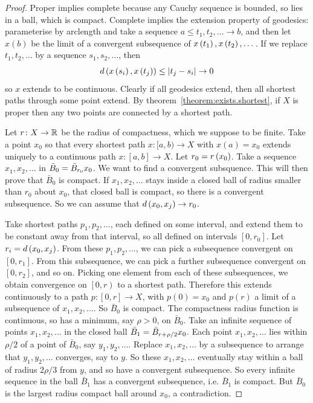 \begin{proof}
Proper implies complete because any Cauchy sequence is bounded, so lies in a ball, which is compact.
Complete implies the extension property of geodesics: parameterise by arclength and take a sequence \(a \le t_1, t_2, \dots \to b\), and then let \(x(b)\) be the limit of a convergent subsequence of \(x\left(t_1\right), x\left(t_2\right), \dots\).
If we replace \(t_1, t_2, \dots\) by a sequence \(s_1, s_2, \dots\), then 
\[
d\left(x\left(s_i\right),x\left(t_j\right)\right) \le \left|t_j-s_i\right| \to 0
\]
so \(x\) extends to be continuous.
Clearly if all geodesics extend, then all shortest paths through some point extend.
By theorem~\vref{theorem:exists.shortest}, if \(X\) is proper then any two points are connected by a shortest path.

Let \(r \colon X \to \mathbb{R}^{}\) be the radius of compactness, which we suppose to be finite.
Take a point \(x_0\) so that every shortest path \(x \colon [a,b) \to X\) with \(x(a)=x_0\) extends uniquely to a continuous path \(x \colon [a,b] \to X\).
Let \(r_0=r\left(x_0\right)\).
Take a sequence \(x_1, x_2, \dots\) in \(\bar{B}_0=\ballClosed{r_0}{x_0}\).
We want to find a convergent subsquence.
This will then prove that \(\bar{B}_0\) is compact.
If \(x_1, x_2, \dots\) stays inside a closed ball of radius smaller than \(r_0\) about \(x_0\), that closed ball is compact, so there is a convergent subsequence.
So we can assume that \(d\left(x_0,x_j\right) \to r_0\).

Take shortest paths \(p_1, p_2, \dots\), each defined on some interval, and extend them to be constant away from that interval, so all defined on intervals \(\left[0,r_0\right]\).
Let \(r_i=d\left(x_0,x_j\right)\).
From these \(p_1, p_2, \dots\), we can pick a subsequence convergent on \(\left[0,r_1\right]\).
From this subsequence, we can pick a further subsequence convergent on \(\left[0,r_2\right]\), and so on.
Picking one element from each of these subsequences, we obtain convergence on \(\left[0,r\right)\) to a shortest path.
Therefore this extends continuously to a path \(p \colon [0,r] \to X\), with \(p(0)=x_0\) and \(p(r)\) a limit of a subsequence of \(x_1, x_2, \dots\).
So \(\bar{B}_0\) is compact.
The compactness radius function is continuous, so has a minimum, say \(\rho>0\), on \(\bar{B}_0\).
Take an infinite sequence of points \(x_1, x_2, \dots\) in the closed ball \(\bar{B}_1=\ballClosed{r+\rho/2}{x_0}\).
Each point \(x_1, x_2, \dots\) lies within \(\rho/2\) of a point of \(\bar{B}_0\), say \(y_1, y_2, \dots\).
Replace \(x_1, x_2, \dots\) by a subsequence to arrange that \(y_1, y_2, \dots\) converges, say to \(y\).
So these \(x_1, x_2, \dots\) eventually stay within a ball of radius \(2\rho/3\) from \(y\), and so have a convergent subsequence.
So every infinite sequence in the ball \(\bar{B}_1\) has a convergent subsequence, i.e. \(\bar{B}_1\) is compact.
But \(\bar{B}_0\) is the largest radius compact ball around \(x_0\), a contradiction.
\end{proof}
